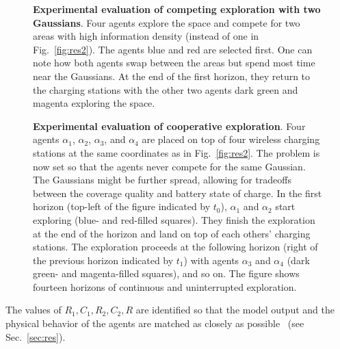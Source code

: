 \documentclass[letterpaper,10pt,conference,twoside]{IEEEtran}
\theoremstyle{definition}
\begin{document}
\begin{figure}[b!]
  \vspace*{-.15cm}
  \hspace*{-.2cm}
  
  \caption{\textbf{Experimental evaluation of %
  competing exploration with two Gaussians}. Four agents explore the space and compete for two areas with high information density (instead of one in Fig.~\ref{fig:res2}). The agents blue and red are selected first. One can note how both agents swap between the areas but spend most time near the Gaussians. At the end of the first horizon, they return to the charging stations with the other two agents dark green and magenta exploring the space.}
  \label{fig:res3}
\end{figure}

\begin{figure*}[t!]
  \vspace*{.17cm}
  \begin{minipage}[t]{1\columnwidth}
    
  \end{minipage}
  \hspace{.42cm}
  \begin{minipage}[t]{.97\columnwidth}
    \vspace*{-4.2cm}
    \caption{\textbf{Experimental evaluation of cooperative exploration}. Four agents $\alpha_1$, $\alpha_2$, $\alpha_3$, and $\alpha_4$ are placed on top of four wireless charging stations at the same coordinates as in Fig.~\ref{fig:res2}. The problem is now set so %
    that the agents never compete for the same Gaussian. The Gaussians might be further spread, allowing for tradeoffs between the coverage quality and battery state of charge. In the first horizon (top-left of the figure indicated by $t_0$), $\alpha_1$ and $\alpha_2$ start exploring (blue- and red-filled squares). They finish the exploration at the end of the horizon and land on top of each others' charging stations. The exploration proceeds at the following horizon (right of the previous horizon indicated by $t_1$) with agents $\alpha_3$ and $\alpha_4$ (dark green- and magenta-filled squares), and so on. The figure shows fourteen horizons of continuous and uninterrupted exploration.}
    \label{fig:res}
  \end{minipage}
  \vspace*{-.6cm}
\end{figure*}

The values of $R_1,C_1,R_2,C_2,R$ are identified so that the model output and the physical behavior of the agents are matched as closely as possible~\cite{zhao2017observability} (see Sec.~\ref{sec:res}).
\end{document}
